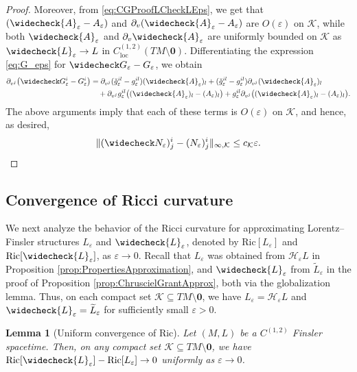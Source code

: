 \documentclass[a4paper,11pt]{article}
\numberwithin{equation}{section}
\theoremstyle{definition}
\theoremstyle{plain}
\newtheorem{Lemma}[Definition]{Lemma}
\newcommand{\eps}{\varepsilon}
\newcommand{\Ric}{\mathrm{Ric}}
\newcommand{\loc}{\mathrm{loc}}
\begin{document}
\begin{proof}
Moreover, from \eqref{eq:CGProofLCheckLEps}, we get that $(\widecheck{A}_\eps - A_\eps)$ and $\partial_v (\widecheck{A}_\eps - A_\eps)$ are $O(\eps)$ on $\mathcal{K}$, while both $\widecheck{A}_\eps$ and $\partial_v \widecheck{A}_\eps$ are uniformly bounded on $\mathcal{K}$ as $\widecheck{L}_\eps \rightarrow L$ in $C^{(1,2)}_\loc(TM \setminus \mathbf{0})$. 
Differentiating the expression \eqref{eq:G_eps} for
$\widecheck G_\eps-G_\eps$, we obtain
\begin{equation}\label{eq:ProofCGN}
\begin{split}
    \partial_{v^j} \bigl(\widecheck G_\eps^i -G_\eps^i \bigr)
    &= \partial_{v^j} (\check g_\eps^{il}-g_\eps^{il})
    (\widecheck{A}_\eps)_l + (\check g_\eps^{il}-g_\eps^{il})
    \partial_{v^j} (\widecheck{A}_\eps)_l \\
    &\quad + \partial_{v^j} g_\eps^{il} \bigl( (\widecheck{A}_\eps)_l - (A_\eps)_l \bigr) + g_\eps^{il} \partial_{v^j} \bigl((\widecheck{A}_\eps)_l - (A_\eps)_l\bigr).
\end{split}
\end{equation}
The above arguments imply that each of these terms is $O(\eps)$ on $\mathcal{K}$, and hence, as desired,
\begin{equation*}
    \|(\widecheck N_\eps)^i_j-(N_\eps)^i_j\|_{\infty,\mathcal{K}}
    \leq c_{\mathcal{K}}\eps. \qedhere
\end{equation*}
\end{proof}

\subsection{Convergence of Ricci curvature}
\label{ssc:convergence}

We next analyze the behavior of the Ricci curvature for approximating Lorentz--Finsler structures $L_\eps$ and $\widecheck{L}_\eps$, denoted by $\Ric[L_\eps]$ and $\Ric[\widecheck{L}_\eps]$, as $\eps \to 0$.
Recall that $L_\eps$ was obtained from $\mathcal{H}_\eps L$ in Proposition \ref{prop:PropertiesApproximation}, and $\widecheck{L}_\eps$ from $\widetilde{L}_\eps$ in the proof of Proposition \ref{prop:ChruscielGrantApprox}, both via the globalization lemma.
Thus, on each compact set $\mathcal{K} \subseteq TM \setminus \mathbf{0}$, we have $L_\eps =\mathcal{H}_\eps L$ and $\widecheck{L}_\eps =\widetilde{L}_\eps$ for sufficiently small $\eps>0$.

\begin{Lemma}[Uniform convergence of $\Ric$]\label{lem:RicciCheckConvergence}
    Let $(M,L)$ be a $C^{(1,2)}$ Finsler spacetime. Then, on any compact set $\mathcal{K} \subseteq TM \setminus \mathbf{0}$, we have $\Ric [\widecheck{L}_\eps] - \Ric[L_\eps] \rightarrow 0$ uniformly as $\eps \to 0$.
\end{Lemma}
\end{document}
